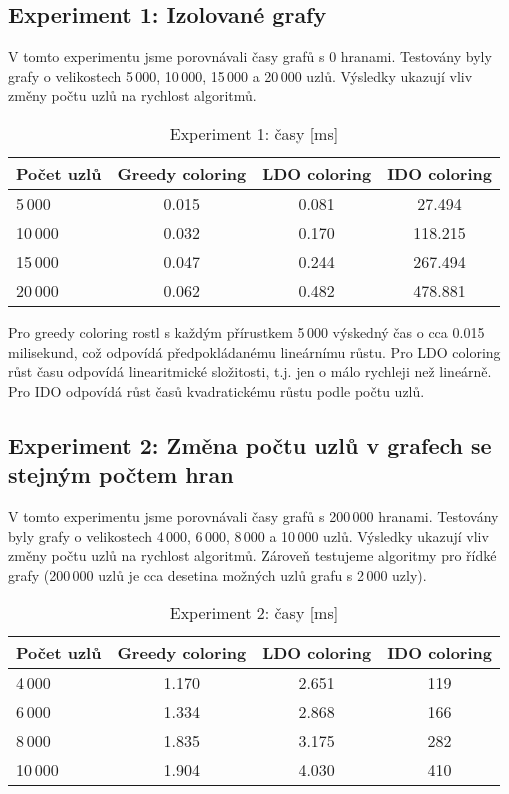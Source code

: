 \documentclass[12pt, a4paper]{article}
\begin{document}
\subsection{Experiment 1: Izolované grafy}
V tomto experimentu jsme porovnávali časy grafů s 0 hranami.
Testovány byly grafy o velikostech 5\,000, 10\,000, 15\,000 a 20\,000 uzlů.
Výsledky ukazují vliv změny počtu uzlů na rychlost algoritmů.
\begin{table}[h!]
  \begin{center}
    \label{tab:table1}
    \begin{tabular}{|l|c|c|c|}
			\hline
      \textbf{Počet uzlů} & \textbf{Greedy coloring} & \textbf{LDO coloring} & \textbf{IDO coloring}\\
      \hline
       5\,000 & 0.015 & 0.081 & 27.494 \\ \hline
      10\,000 & 0.032 & 0.170 & 118.215 \\ \hline
      15\,000 & 0.047 & 0.244 & 267.494 \\ \hline
      20\,000 & 0.062 & 0.482 & 478.881 \\ \hline
    \end{tabular}
    \caption{Experiment 1: časy [ms]}
  \end{center}
\end{table}

Pro greedy coloring rostl s každým přírustkem 5\,000 výskedný čas o cca 0.015 milisekund, což odpovídá předpokládanému lineárnímu růstu.
Pro LDO coloring růst času odpovídá linearitmické složitosti, t.j. jen o málo rychleji než lineárně.
Pro IDO odpovídá růst časů kvadratickému růstu podle počtu uzlů.

\subsection{Experiment 2: Změna počtu uzlů v grafech se stejným počtem hran}
V tomto experimentu jsme porovnávali časy grafů s 200\,000 hranami.
Testovány byly grafy o velikostech 4\,000, 6\,000, 8\,000 a 10\,000 uzlů.
Výsledky ukazují vliv změny počtu uzlů na rychlost algoritmů.
Zároveň testujeme algoritmy pro řídké grafy (200\,000 uzlů je cca desetina možných uzlů grafu s 2\,000 uzly).
\begin{table}[h!]
  \begin{center}
    \label{tab:table1}
    \begin{tabular}{|l|c|c|c|}
			\hline
      \textbf{Počet uzlů} & \textbf{Greedy coloring} & \textbf{LDO coloring} & \textbf{IDO coloring}\\
      \hline
       4\,000 & 1.170 & 2.651 & 119 \\ \hline
       6\,000 & 1.334 & 2.868 & 166 \\ \hline
       8\,000 & 1.835 & 3.175 & 282 \\ \hline
      10\,000 & 1.904 & 4.030 & 410 \\ \hline
    \end{tabular}
    \caption{Experiment 2: časy [ms]}
  \end{center}
\end{table}
\end{document}
